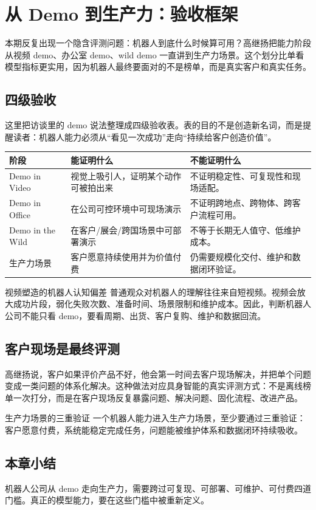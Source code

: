 \section{从 Demo 到生产力：验收框架}

本期反复出现一个隐含评测问题：机器人到底什么时候算可用？高继扬把能力阶段从视频 demo、办公室 demo、wild demo 一直讲到生产力场景。这个划分比单看模型指标更实用，因为机器人最终要面对的不是榜单，而是真实客户和真实任务。

\subsection{四级验收}

这里把访谈里的 demo 说法整理成四级验收表。表的目的不是创造新名词，而是提醒读者：机器人能力必须从“看见一次成功”走向“持续给客户创造价值”。

\begin{longtable}{p{}p{}p{}}
\toprule
阶段 & 能证明什么 & 不能证明什么 \\
\midrule
Demo in Video & 视觉上吸引人，证明某个动作可被拍出来 & 不证明稳定性、可复现性和现场适配。 \\
Demo in Office & 在公司可控环境中可现场演示 & 不证明跨地点、跨物体、跨客户流程可用。 \\
Demo in the Wild & 在客户/展会/跨国场景中可部署演示 & 不等于长期无人值守、低维护成本。 \\
生产力场景 & 客户愿意持续使用并为价值付费 & 仍需要规模化交付、维护和数据闭环验证。 \\
\bottomrule
\end{longtable}

\begin{warningbox}{视频塑造的机器人认知偏差}
普通观众对机器人的理解往往来自短视频。视频会放大成功片段，弱化失败次数、准备时间、场景限制和维护成本。因此，判断机器人公司不能只看 demo，要看周期、出货、客户复购、维护和数据回流。
\end{warningbox}

\subsection{客户现场是最终评测}

高继扬说，客户如果评价产品不好，他会第一时间去客户现场解决，并把单个问题变成一类问题的体系化解决。这种做法对应具身智能的真实评测方式：不是离线榜单一次打分，而是在客户现场反复暴露问题、解决问题、固化流程、改进产品。

\begin{importantbox}{生产力场景的三重验证}
一个机器人能力进入生产力场景，至少要通过三重验证：客户愿意付费，系统能稳定完成任务，问题能被维护体系和数据闭环持续吸收。
\end{importantbox}

\subsection{本章小结}

机器人公司从 demo 走向生产力，需要跨过可复现、可部署、可维护、可付费四道门槛。真正的模型能力，要在这些门槛中被重新定义。

